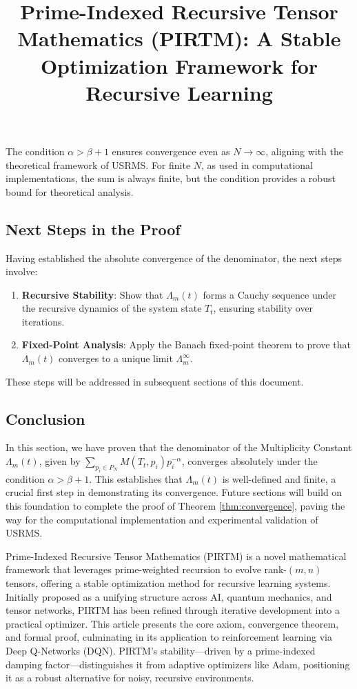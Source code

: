\documentclass{article}
\theoremstyle{plain}
\begin{document}
\begin{remark}
The condition \( \alpha > \beta + 1 \) ensures convergence even as \( N \to \infty \), aligning with the theoretical framework of USRMS. For finite \( N \), as used in computational implementations, the sum is always finite, but the condition provides a robust bound for theoretical analysis.
\end{remark}

\subsection{Next Steps in the Proof}
Having established the absolute convergence of the denominator, the next steps involve:
\begin{enumerate}
    \item \textbf{Recursive Stability}: Show that \( \Lambda_m(t) \) forms a Cauchy sequence under the recursive dynamics of the system state \( T_t \), ensuring stability over iterations.
    \item \textbf{Fixed-Point Analysis}: Apply the Banach fixed-point theorem to prove that \( \Lambda_m(t) \) converges to a unique limit \( \Lambda_m^{\infty} \).
\end{enumerate}
These steps will be addressed in subsequent sections of this document.

\subsection{Conclusion}
In this section, we have proven that the denominator of the Multiplicity Constant \( \Lambda_m(t) \), given by \( \sum_{p_i \in P_N} M(T_t, p_i) p_i^{-\alpha} \), converges absolutely under the condition \( \alpha > \beta + 1 \). This establishes that \( \Lambda_m(t) \) is well-defined and finite, a crucial first step in demonstrating its convergence. Future sections will build on this foundation to complete the proof of Theorem \ref{thm:convergence}, paving the way for the computational implementation and experimental validation of USRMS.


\title{Prime-Indexed Recursive Tensor Mathematics (PIRTM): A Stable Optimization Framework for Recursive Learning}

Prime-Indexed Recursive Tensor Mathematics (PIRTM) is a novel mathematical framework that leverages prime-weighted recursion to evolve rank-$(m,n)$ tensors, offering a stable optimization method for recursive learning systems. Initially proposed as a unifying structure across AI, quantum mechanics, and tensor networks, PIRTM has been refined through iterative development into a practical optimizer. This article presents the core axiom, convergence theorem, and formal proof, culminating in its application to reinforcement learning via Deep Q-Networks (DQN). PIRTM’s stability—driven by a prime-indexed damping factor—distinguishes it from adaptive optimizers like Adam, positioning it as a robust alternative for noisy, recursive environments.
\end{document}
